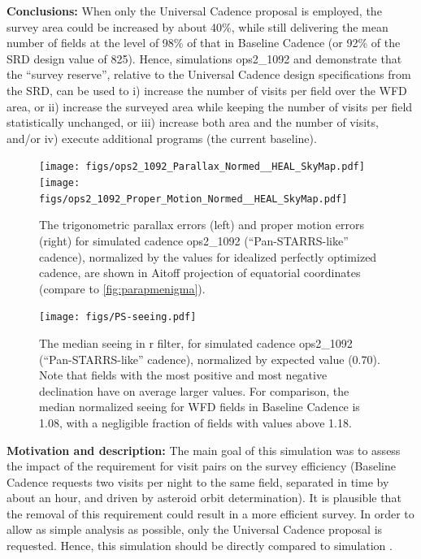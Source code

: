 {\bf Conclusions:} When only the Universal Cadence proposal is
employed, the survey area could be increased by about 40\%, while
still delivering the mean number of fields at the level of 98\% of
that in Baseline Cadence (or 92\% of the SRD design value of 825).
Hence, simulations ops2\_1092  and  demonstrate
that the ``survey reserve'', relative to the Universal Cadence design
specifications from the SRD, can be used to i) increase the number of
visits per field over the WFD area,  or ii) increase the surveyed area
while keeping the number of visits per field statistically unchanged,
or iii) increase both area and the number of visits, and/or iv)
execute additional programs (the current baseline).


\begin{figure}[t!]
\vskip -0.03in
\texttt{[image: figs/ops2\_1092\_Parallax\_Normed\_\_HEAL\_SkyMap.pdf]}
\texttt{[image: figs/ops2\_1092\_Proper\_Motion\_Normed\_\_HEAL\_SkyMap.pdf]}
\vskip -0.2in
\caption{The trigonometric parallax errors (left) and proper motion errors (right)  for simulated cadence
ops2\_1092 (``Pan-STARRS-like'' cadence), normalized by the values for idealized perfectly optimized
cadence, are shown in Aitoff projection of equatorial coordinates (compare to \autoref{fig:parapmenigma}).}
\label{fig:parapmenigma2}
\end{figure}

\begin{figure}[t!]
\vskip -3.9in
\hskip -0.5in
\texttt{[image: figs/PS-seeing.pdf]}
\vskip -4.0in
\caption{The median seeing in r filter, for simulated cadence ops2\_1092 (``Pan-STARRS-like'' cadence),
normalized by expected value (0.70). Note that fields with the most positive and most negative
declination have on average larger values. For comparison, the median normalized seeing for WFD fields
in Baseline Cadence is 1.08, with a negligible fraction of fields with values above 1.18.}
\label{fig:PS-seeing}
\end{figure}




{\bf Motivation and description:} The main goal of this simulation was
to assess the impact of the requirement for visit pairs on the survey
efficiency (Baseline Cadence requests two visits per night to the same
field, separated in time by about an hour, and driven by asteroid
orbit determination). It is plausible that the removal of this
requirement could result in a more efficient survey. In order to allow
as simple analysis as possible, only the Universal Cadence proposal is
requested. Hence, this simulation should be directly compared to
simulation . \\

